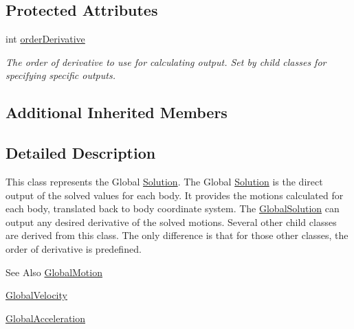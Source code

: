\subsection*{Protected Attributes}
\begin{DoxyCompactItemize}
\item 
\hypertarget{classosea_1_1ofreq_1_1_global_solution_a935843ad9f4fd2de2a2ec407de45a20d}{int \hyperlink{classosea_1_1ofreq_1_1_global_solution_a935843ad9f4fd2de2a2ec407de45a20d}{order\-Derivative}}\label{classosea_1_1ofreq_1_1_global_solution_a935843ad9f4fd2de2a2ec407de45a20d}

\begin{DoxyCompactList}\small\item\em The order of derivative to use for calculating output. Set by child classes for specifying specific outputs. \end{DoxyCompactList}\end{DoxyCompactItemize}
\subsection*{Additional Inherited Members}


\subsection{Detailed Description}
This class represents the Global \hyperlink{classosea_1_1ofreq_1_1_solution}{Solution}. The Global \hyperlink{classosea_1_1ofreq_1_1_solution}{Solution} is the direct output of the solved values for each body. It provides the motions calculated for each body, translated back to body coordinate system. The \hyperlink{classosea_1_1ofreq_1_1_global_solution}{Global\-Solution} can output any desired derivative of the solved motions. Several other child classes are derived from this class. The only difference is that for those other classes, the order of derivative is predefined. \begin{DoxySeeAlso}{See Also}
\hyperlink{classosea_1_1ofreq_1_1_global_motion}{Global\-Motion} 

\hyperlink{classosea_1_1ofreq_1_1_global_velocity}{Global\-Velocity} 

\hyperlink{classosea_1_1ofreq_1_1_global_acceleration}{Global\-Acceleration} 
\end{DoxySeeAlso}


